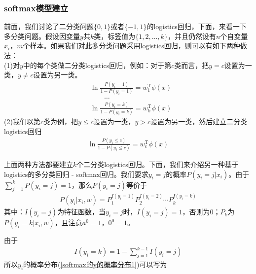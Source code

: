         \subsubsection{softmax模型建立}
            \par
            前面，我们讨论了二分类问题$\{0,1\}$或者$\{-1,1\}$的logistics回归，下面，来看一下多分类问题。假设因变量$y$共$k$类，标签值为$\{1,2,\dots,k\}$，并且仍然设有$n$个自变量$x_i$，$m$个样本。如果我们对此多分类问题采用logistics回归，则可以有如下两种做法：\\
            (1)对$y$中的每个类做二分类logistics回归，例如：对于第$c$类而言，把$y = c$设置为一类，$y \neq c$设置为另一类。
            \begin{align*}
            & \ln \frac{P(y_i=1)}{1-P(y_i = 1)} = w_1^\mathrm{T}\phi(x)\\
            & \qquad \dots\\
            & \ln \frac{P(y_i=k)}{1-P(y_i = k)} = w_k^\mathrm{T}\phi(x)
            \end{align*}
            (2)我们以第$c$类为例，把$y \leqslant c$设置为一类，$y>c$设置为另一类，然后建立二分类logistics回归
            \begin{align*}
            \ln \frac{P(y_i \leqslant c)}{1-P(y_i \leqslant c)} = w_c^\mathrm{T}\phi(x)
            \end{align*}
            \par
            上面两种方法都要建立$k$个二分类logistics回归。下面，我们来介绍另一种基于logistics的多分类回归 - softmax回归。我们要求$y_i = j$的概率$P(y_i = j|x_i)$。由于$\sum\limits_{j=1}^k P(y_i = j) = 1$，那么$P(y_i = j)$等价于
            \begin{align}
            \label{softmax的y的概率分布1}
            P(y_i|x_i,w) = P_1^{I(y_i=1)}P_2^{I(y_i=2)}\cdots P_k^{I(y_i=k)}
            \end{align}
            其中：$I(y_i=j)$为特征函数，当$y_i=j$时，$I(y_i=j)=1$，否则为0；$P_k$为$P(y_i=k|x_i,w)$，且注意$a^0=1$，$0^0=1$。
            \par
            由于
            \begin{align*}
            I(y_i=k) = 1-\sum_{j=1}^{k-1}I(y_i=j)
            \end{align*}
            所以$y_i$的概率分布(\ref{softmax的y的概率分布1})可以写为
